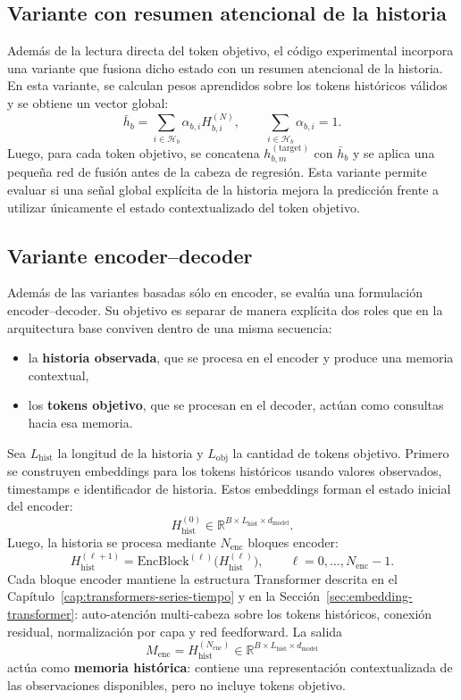 \subsection{Variante con resumen atencional de la historia}
\label{sec:attention-pooling-readout}

Además de la lectura directa del token objetivo, el código experimental incorpora una variante que fusiona dicho estado con un resumen atencional de la historia. En esta variante, se calculan pesos aprendidos sobre los tokens históricos válidos y se obtiene un vector global:
\[
    \bar{h}_{b} = \sum_{i \in \mathcal{H}_b} \alpha_{b,i} H^{(N)}_{b,i},
    \qquad
    \sum_{i \in \mathcal{H}_b}\alpha_{b,i}=1.
\]
Luego, para cada token objetivo, se concatena $h^{(\text{target})}_{b,m}$ con $\bar{h}_{b}$ y se aplica una pequeña red de fusión antes de la cabeza de regresión. Esta variante permite evaluar si una señal global explícita de la historia mejora la predicción frente a utilizar únicamente el estado contextualizado del token objetivo.

\subsection{Variante encoder--decoder}
\label{sec:variante-encoder-decoder}

Además de las variantes basadas sólo en encoder, se evalúa una formulación encoder--decoder. Su objetivo es separar de manera explícita dos roles que en la arquitectura base conviven dentro de una misma secuencia:
\begin{itemize}
    \item la \textbf{historia observada}, que se procesa en el encoder y produce una memoria contextual,
    \item los \textbf{tokens objetivo}, que se procesan en el decoder, actúan como consultas hacia esa memoria.
\end{itemize}

Sea $L_{\text{hist}}$ la longitud de la historia y $L_{\text{obj}}$ la cantidad de tokens objetivo. Primero se construyen embeddings para los tokens históricos usando valores observados, timestamps e identificador de historia. Estos embeddings forman el estado inicial del encoder:
\[
    H_{\text{hist}}^{(0)} \in \mathbb{R}^{B \times L_{\text{hist}} \times d_{\text{model}}}.
\]
Luego, la historia se procesa mediante $N_{\text{enc}}$ bloques encoder:
\[
    H_{\text{hist}}^{(\ell+1)}
    =
    \mathrm{EncBlock}^{(\ell)}
    \bigl(H_{\text{hist}}^{(\ell)}\bigr),
    \qquad \ell=0,\dots,N_{\text{enc}}-1.
\]
Cada bloque encoder mantiene la estructura Transformer descrita en el Capítulo~\ref{cap:transformers-series-tiempo} y en la Sección~\ref{sec:embedding-transformer}: auto-atención multi-cabeza sobre los tokens históricos, conexión residual, normalización por capa y red feedforward.
La salida
\[
    M_{\text{enc}} = H_{\text{hist}}^{(N_{\text{enc}})}
    \in \mathbb{R}^{B \times L_{\text{hist}} \times d_{\text{model}}}
\]
actúa como \textbf{memoria histórica}: contiene una representación contextualizada de las observaciones disponibles, pero no incluye tokens objetivo.

